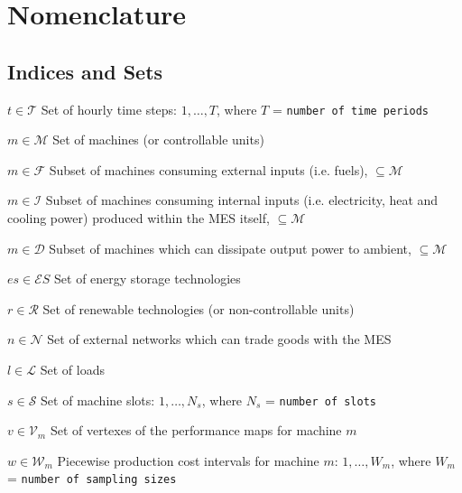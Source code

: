 \documentclass{article}
\newcommand{\cT}{{\mathcal T}}
\newcommand{\cM}{{\mathcal M}}
\newcommand{\cP}{{\mathcal P}}
\newcommand{\cQ}{{\mathcal Q}}
\newcommand{\cC}{{\mathcal C}}
\newcommand{\cF}{{\mathcal F}}
\newcommand{\cI}{{\mathcal I}}
\newcommand{\cD}{{\mathcal D}}
\newcommand{\cS}{{\mathcal S}}
\newcommand{\cR}{{\mathcal R}}
\newcommand{\cES}{{\mathcal ES}}
\newcommand{\cN}{{\mathcal N}}
\newcommand{\cL}{{\mathcal L}}
\newcommand{\cV}{{\mathcal V}}
\newcommand{\cG}{{\mathcal G}}
\newcommand{\cW}{{\mathcal W}}
\newcommand\mydescriptionopt{
	\IEEEsetlabelwidth{$g \in \cG_{\textit{off}}^0$]}
	\IEEEusemathlabelsep
}
\begin{document}
\section{Nomenclature}

\subsection{Indices and Sets}
\begin{IEEEdescription}[\mydescriptionopt] 
	\item[$t \in \cT$] Set of hourly time steps: $1, \ldots, T$, where $T$ = {\tt number of time periods}
	\item[$m \in \cM$] Set of machines (or controllable units)

	\item[$m \in \cF$] Subset of machines consuming external inputs (i.e. fuels), $\subseteq \cM$
	\item[$m \in \cI$] Subset of machines consuming internal inputs (i.e. electricity, heat and cooling power) produced within the MES itself, $\subseteq \cM$

	\item[$m \in \cD$] Subset of machines which can dissipate output power to ambient, $\subseteq \cM$
	
	\item[$es \in \cES$] Set of energy storage technologies
	
	\item[$r \in \cR$] Set of renewable technologies (or non-controllable units)
	
	\item[$n \in \cN$] Set of external networks which can trade goods with the MES
		
	\item[$l \in \cL$] Set of loads
	
	\item[$s \in \cS$] Set of machine slots: $1, \ldots, N_{s}$, where $N_{s}$ = {\tt number of slots}
	
	\item[$v \in \cV_{m}$] Set of vertexes of the performance maps for machine $m$
	
	\item[$w \in \cW_m$] Piecewise production cost intervals for machine $m$: $1, \ldots, W_m$, where $W_m$ = {\tt 			    number of sampling sizes}

\end{IEEEdescription}
\end{document}

